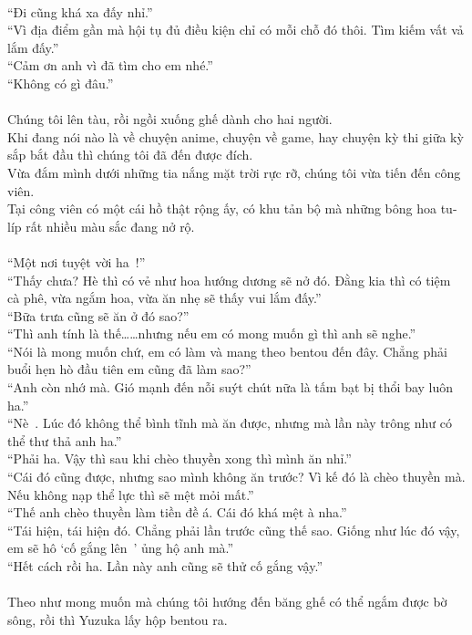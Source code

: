 \documentclass[12pt,a4paper, twosides]{book}
\begin{document}
\\
“Đi cũng khá xa đấy nhỉ.”\\
“Vì địa điểm gần mà hội tụ đủ điều kiện chỉ có mỗi chỗ đó thôi. Tìm kiếm vất vả lắm đấy.”\\
“Cảm ơn anh vì đã tìm cho em nhé.”\\
“Không có gì đâu.”\\
\\
Chúng tôi lên tàu, rồi ngồi xuống ghế dành cho hai người.\\
Khi đang nói nào là về chuyện anime, chuyện về game, hay chuyện kỳ thi giữa kỳ sắp bắt đầu thì chúng tôi đã đến được đích.\\
Vừa đắm mình dưới những tia nắng mặt trời rực rỡ, chúng tôi vừa tiến đến công viên.\\
Tại công viên có một cái hồ thật rộng ấy, có khu tản bộ mà những bông hoa tu-líp rất nhiều màu sắc đang nở rộ.\\
\\
“Một nơi tuyệt vời ha~!”\\
“Thấy chưa? Hè thì có vẻ như hoa hướng dương sẽ nở đó. Đằng kia thì có tiệm cà phê, vừa ngắm hoa, vừa ăn nhẹ sẽ thấy vui lắm đấy.”\\
“Bữa trưa cũng sẽ ăn ở đó sao?”\\
“Thì anh tính là thế……nhưng nếu em có mong muốn gì thì anh sẽ nghe.”\\
“Nói là mong muốn chứ, em có làm và mang theo bentou đến đây. Chẳng phải buổi hẹn hò đầu tiên em cũng đã làm sao?”\\
“Anh còn nhớ mà. Gió mạnh đến nỗi suýt chút nữa là tấm bạt bị thổi bay luôn ha.”\\
“Nè~. Lúc đó không thể bình tĩnh mà ăn được, nhưng mà lần này trông như có thể thư thả anh ha.”\\
“Phải ha. Vậy thì sau khi chèo thuyền xong thì mình ăn nhỉ.”\\
“Cái đó cũng được, nhưng sao mình không ăn trước? Vì kế đó là chèo thuyền mà. Nếu không nạp thể lực thì sẽ mệt mỏi mất.”\\
“Thế anh chèo thuyền làm tiền đề á. Cái đó khá mệt à nha.”\\
“Tái hiện, tái hiện đó. Chẳng phải lần trước cũng thế sao. Giống như lúc đó vậy, em sẽ hô ‘cố gắng lên~’ ủng hộ anh mà.”\\
“Hết cách rồi ha. Lần này anh cũng sẽ thử cố gắng vậy.”\\
\\
Theo như mong muốn mà chúng tôi hướng đến băng ghế có thể ngắm được bờ sông, rồi thì Yuzuka lấy hộp bentou ra.\\
\end{document}
